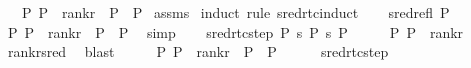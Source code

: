 \begin{isabellebody}
\ \ \ {\isachardoublequoteopen}{\isacharparenleft}{\kern0pt}P{}{\isacharcomma}{\kern0pt}\ P{}{\isacharparenright}{\kern0pt}\ {\isasymin}\ rank{\isacharunderscore}{\kern0pt}r\ {\isasymor}\ P{}\ {\isacharequal}{\kern0pt}\ P{}{\isachardoublequoteclose}\isanewline
%
\isadelimproof
%
\endisadelimproof
%
\isatagproof
{}\isamarkupfalse%
\ assms\isanewline
{}\isamarkupfalse%
\ {\isacharparenleft}{\kern0pt}induct\ rule{\isacharcolon}{\kern0pt}\ sred{\isacharunderscore}{\kern0pt}rtc{\isachardot}{\kern0pt}induct{\isacharparenright}{\kern0pt}\isanewline
\ \ \isamarkupfalse%
\ {\isacharparenleft}{\kern0pt}sred{\isacharunderscore}{\kern0pt}refl\ P{}{\isacharparenright}{\kern0pt}\isanewline
\ \ \isamarkupfalse%
\ \isamarkupfalse%
\ {\isachardoublequoteopen}{\isacharparenleft}{\kern0pt}P{}{\isacharcomma}{\kern0pt}\ P{}{\isacharparenright}{\kern0pt}\ {\isasymin}\ rank{\isacharunderscore}{\kern0pt}r\ {\isasymor}\ P{}\ {\isacharequal}{\kern0pt}\ P{}{\isachardoublequoteclose}\ \isamarkupfalse%
\ simp\isanewline
{}\isamarkupfalse%
\isanewline
\ \ \isamarkupfalse%
\ {\isacharparenleft}{\kern0pt}sred{\isacharunderscore}{\kern0pt}rtc{\isacharunderscore}{\kern0pt}step\ P{}\ s{}\ P{\isacharprime}{\kern0pt}\ s{}\ P{}{\isacharparenright}{\kern0pt}\isanewline
\ \ \isamarkupfalse%
\ \isamarkupfalse%
\ {\isachardoublequoteopen}{\isacharparenleft}{\kern0pt}P{\isacharprime}{\kern0pt}{\isacharcomma}{\kern0pt}\ P{}{\isacharparenright}{\kern0pt}\ {\isasymin}\ rank{\isacharunderscore}{\kern0pt}r{\isachardoublequoteclose}\isanewline
\ \ \ \ \isamarkupfalse%
\ rank{\isacharunderscore}{\kern0pt}r{\isacharunderscore}{\kern0pt}sred\ \isamarkupfalse%
\ blast\isanewline
\ \ \isamarkupfalse%
\ \isamarkupfalse%
\ {\isachardoublequoteopen}{\isacharparenleft}{\kern0pt}P{}{\isacharcomma}{\kern0pt}\ P{\isacharprime}{\kern0pt}{\isacharparenright}{\kern0pt}\ {\isasymin}\ rank{\isacharunderscore}{\kern0pt}r\ {\isasymor}\ P{\isacharprime}{\kern0pt}\ {\isacharequal}{\kern0pt}\ P{}{\isachardoublequoteclose}\isanewline
\ \ \ \ \isamarkupfalse%
\ sred{\isacharunderscore}{\kern0pt}rtc{\isacharunderscore}{\kern0pt}step\ \isamarkupfalse%

\end{isabellebody}

